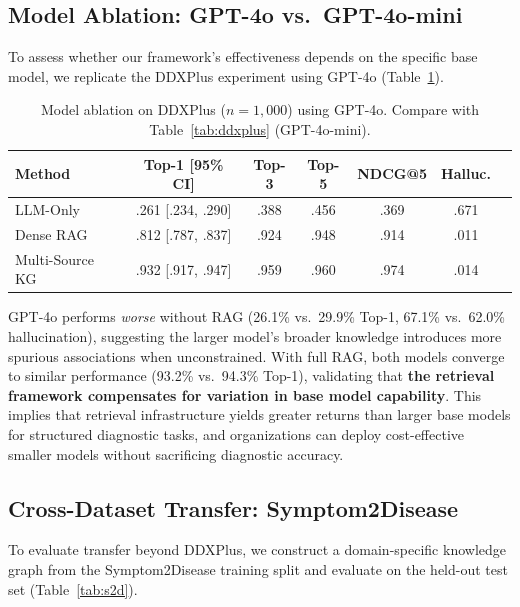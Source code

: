 \documentclass[runningheads]{llncs}
\begin{document}
\subsection{Model Ablation: GPT-4o vs.\ GPT-4o-mini}
\label{sec:model_ablation}

To assess whether our framework's effectiveness depends on the specific base model, we replicate the DDXPlus experiment using GPT-4o (Table~\ref{tab:gpt4o}).

\begin{table}[t]
\centering
\caption{Model ablation on DDXPlus ($n{=}1{,}000$) using GPT-4o. Compare with Table~\ref{tab:ddxplus} (GPT-4o-mini).}
\label{tab:gpt4o}
\begin{tabular}{lcccccc}
\toprule
\textbf{Method} & \textbf{Top-1 [95\% CI]} & \textbf{Top-3} & \textbf{Top-5} & \textbf{NDCG@5} & \textbf{Halluc.} \\
\midrule
LLM-Only       & .261 [.234, .290] & .388 & .456 & .369 & .671 \\
Dense RAG       & .812 [.787, .837] & .924 & .948 & .914 & .011 \\
Multi-Source KG & .932 [.917, .947] & .959 & .960 & .974 & .014 \\
\bottomrule
\end{tabular}
\end{table}

GPT-4o performs \emph{worse} without RAG (26.1\% vs.\ 29.9\% Top-1, 67.1\% vs.\ 62.0\% hallucination), suggesting the larger model's broader knowledge introduces more spurious associations when unconstrained. With full RAG, both models converge to similar performance (93.2\% vs.\ 94.3\% Top-1), validating that \textbf{the retrieval framework compensates for variation in base model capability}. This implies that retrieval infrastructure yields greater returns than larger base models for structured diagnostic tasks, and organizations can deploy cost-effective smaller models without sacrificing diagnostic accuracy.

\subsection{Cross-Dataset Transfer: Symptom2Disease}
\label{sec:cross_domain}

To evaluate transfer beyond DDXPlus, we construct a domain-specific knowledge graph from the Symptom2Disease training split and evaluate on the held-out test set (Table~\ref{tab:s2d}).
\end{document}
